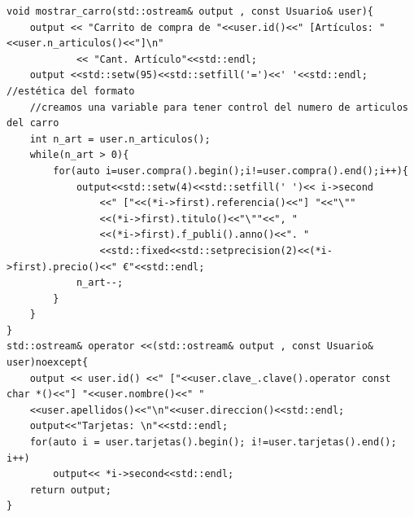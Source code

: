 \begin{verbatim}
void mostrar_carro(std::ostream& output , const Usuario& user){
    output << "Carrito de compra de "<<user.id()<<" [Artículos: "<<user.n_articulos()<<"]\n"
            << "Cant. Artículo"<<std::endl;
    output <<std::setw(95)<<std::setfill('=')<<' '<<std::endl; //estética del formato
    //creamos una variable para tener control del numero de articulos del carro
    int n_art = user.n_articulos();
    while(n_art > 0){
        for(auto i=user.compra().begin();i!=user.compra().end();i++){
            output<<std::setw(4)<<std::setfill(' ')<< i->second
                <<" ["<<(*i->first).referencia()<<"] "<<"\""
                <<(*i->first).titulo()<<"\""<<", "
                <<(*i->first).f_publi().anno()<<". "
                <<std::fixed<<std::setprecision(2)<<(*i->first).precio()<<" €"<<std::endl;
            n_art--;
        }
    }
}
std::ostream& operator <<(std::ostream& output , const Usuario& user)noexcept{
    output << user.id() <<" ["<<user.clave_.clave().operator const char *()<<"] "<<user.nombre()<<" "
    <<user.apellidos()<<"\n"<<user.direccion()<<std::endl;
    output<<"Tarjetas: \n"<<std::endl;
    for(auto i = user.tarjetas().begin(); i!=user.tarjetas().end(); i++)
        output<< *i->second<<std::endl;
    return output;
}
\end{verbatim}